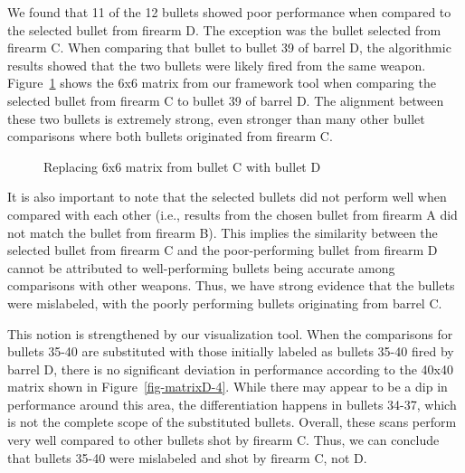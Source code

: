 \documentclass[
  12pt]{article}
\begin{document}
We found that 11 of the 12 bullets showed poor performance when compared
to the selected bullet from firearm D. The exception was the bullet
selected from firearm C. When comparing that bullet to bullet 39 of
barrel D, the algorithmic results showed that the two bullets were
likely fired from the same weapon. Figure~\ref{fig-CD-Comparison} shows
the 6x6 matrix from our framework tool when comparing the selected
bullet from firearm C to bullet 39 of barrel D. The alignment between
these two bullets is extremely strong, even stronger than many other
bullet comparisons where both bullets originated from firearm C.

\begin{figure}


\caption{\label{fig-CD-Comparison}Replacing 6x6 matrix from bullet C
with bullet D}

\end{figure}%

It is also important to note that the selected bullets did not perform
well when compared with each other (i.e., results from the chosen bullet
from firearm A did not match the bullet from firearm B). This implies
the similarity between the selected bullet from firearm C and the
poor-performing bullet from firearm D cannot be attributed to
well-performing bullets being accurate among comparisons with other
weapons. Thus, we have strong evidence that the bullets were mislabeled,
with the poorly performing bullets originating from barrel C.

This notion is strengthened by our visualization tool. When the
comparisons for bullets 35-40 are substituted with those initially
labeled as bullets 35-40 fired by barrel D, there is no significant
deviation in performance according to the 40x40 matrix shown in
Figure~\ref{fig-matrixD-4}. While there may appear to be a dip in
performance around this area, the differentiation happens in bullets
34-37, which is not the complete scope of the substituted bullets.
Overall, these scans perform very well compared to other bullets shot by
firearm C. Thus, we can conclude that bullets 35-40 were mislabeled and
shot by firearm C, not D.
\end{document}
